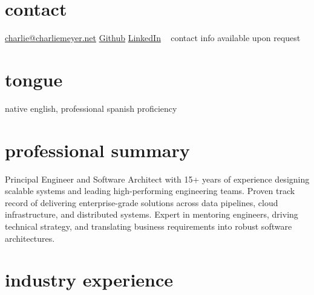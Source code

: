 \documentclass{friggeri-cv} %
\begin{document}


\begin{aside} %
\section{contact}
\href{mailto:charlie@charliemeyer.net}{charlie@charliemeyer.net}
\href{https://www.github.com/cemeyer2}{Github}
\href{www.linkedin.com/in/cemeyer2}{LinkedIn}
~
contact info available upon request
~
\section{tongue}
native english,
professional spanish proficiency
\end{aside}

\section{professional summary}

Principal Engineer and Software Architect with 15+ years of experience designing scalable systems and leading high-performing engineering teams. Proven track record of delivering enterprise-grade solutions across data pipelines, cloud infrastructure, and distributed systems. Expert in mentoring engineers, driving technical strategy, and translating business requirements into robust software architectures.

\section{industry experience}
\end{document}
